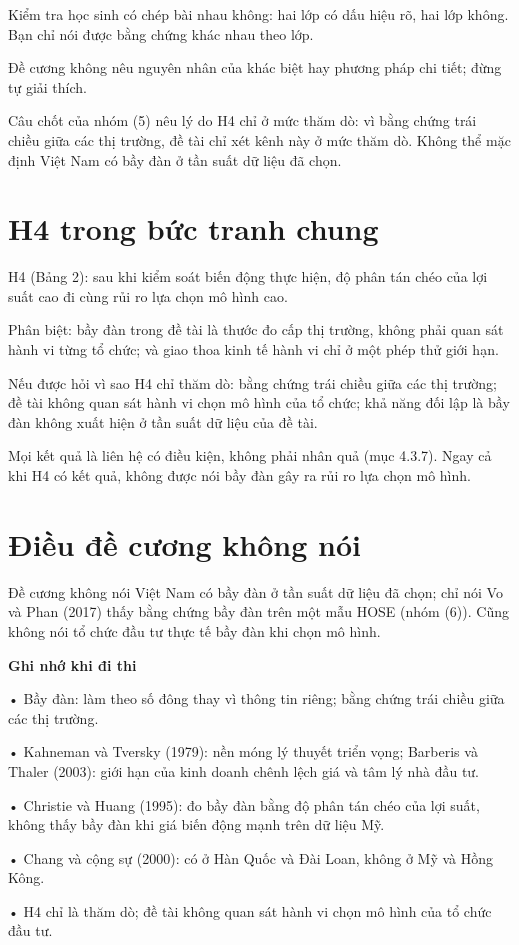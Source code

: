Kiểm tra học sinh có chép bài nhau không: hai lớp có dấu hiệu rõ, hai lớp không. Bạn chỉ nói được bằng chứng khác nhau theo lớp.

Đề cương không nêu nguyên nhân của khác biệt hay phương pháp chi tiết; đừng tự giải thích.

Câu chốt của nhóm (5) nêu lý do H4 chỉ ở mức thăm dò: vì bằng chứng trái chiều giữa các thị trường, đề tài chỉ xét kênh này ở mức thăm dò. Không thể mặc định Việt Nam có bầy đàn ở tần suất dữ liệu đã chọn.

\section{H4 trong bức tranh chung}

H4 (Bảng 2): sau khi kiểm soát biến động thực hiện, độ phân tán chéo của lợi suất cao đi cùng rủi ro lựa chọn mô hình cao.

Phân biệt: bầy đàn trong đề tài là thước đo cấp thị trường, không phải quan sát hành vi từng tổ chức; và giao thoa kinh tế hành vi chỉ ở một phép thử giới hạn.

Nếu được hỏi vì sao H4 chỉ thăm dò: bằng chứng trái chiều giữa các thị trường; đề tài không quan sát hành vi chọn mô hình của tổ chức; khả năng đối lập là bầy đàn không xuất hiện ở tần suất dữ liệu của đề tài.

Mọi kết quả là liên hệ có điều kiện, không phải nhân quả (mục 4.3.7). Ngay cả khi H4 có kết quả, không được nói bầy đàn gây ra rủi ro lựa chọn mô hình.

\section{Điều đề cương không nói}

Đề cương không nói Việt Nam có bầy đàn ở tần suất dữ liệu đã chọn; chỉ nói Vo và Phan (2017) thấy bằng chứng bầy đàn trên một mẫu HOSE (nhóm (6)). Cũng không nói tổ chức đầu tư thực tế bầy đàn khi chọn mô hình.

\begin{tcolorbox}[breakable]
\textbf{Ghi nhớ khi đi thi}

• Bầy đàn: làm theo số đông thay vì thông tin riêng; bằng chứng trái chiều giữa các thị trường.

• Kahneman và Tversky (1979): nền móng lý thuyết triển vọng; Barberis và Thaler (2003): giới hạn của kinh doanh chênh lệch giá và tâm lý nhà đầu tư.

• Christie và Huang (1995): đo bầy đàn bằng độ phân tán chéo của lợi suất, không thấy bầy đàn khi giá biến động mạnh trên dữ liệu Mỹ.

• Chang và cộng sự (2000): có ở Hàn Quốc và Đài Loan, không ở Mỹ và Hồng Kông.

• H4 chỉ là thăm dò; đề tài không quan sát hành vi chọn mô hình của tổ chức đầu tư.
\end{tcolorbox}

